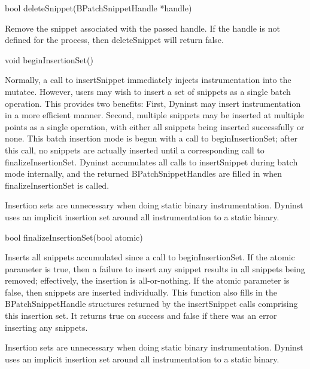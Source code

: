 \begin{apient}
\begin{apient}
bool deleteSnippet(BPatchSnippetHandle *handle)
\end{apient}

\begin{apidesc}
Remove the snippet associated with the passed handle. If the handle is not defined for the process, then deleteSnippet
will return false.
\end{apidesc}

\begin{apient}
void beginInsertionSet()
\end{apient}

\begin{apidesc}
Normally, a call to insertSnippet immediately injects instrumentation into the mutatee. However, users may wish to
insert a set of snippets as a single batch operation. This provides two benefits: First, Dyninst may insert
instrumentation in a more efficient manner. Second, multiple snippets may be inserted at multiple points as a single
operation, with either all snippets being inserted successfully or none. This batch insertion mode is begun with a call
to beginInsertionSet; after this call, no snippets are actually inserted until a corresponding call to
finalizeInsertionSet. Dyninst accumulates all calls to insertSnippet during batch mode internally, and the returned
BPatchSnippetHandles are filled in when finalizeInsertionSet is called.

Insertion sets are un­necessary when doing static binary instrumentation. Dyninst uses an implicit insertion set
around all instrumentation to a static binary.
\end{apidesc}

\begin{apient}
bool finalizeInsertionSet(bool atomic)
\end{apient}

\begin{apidesc}
Inserts all snippets accumulated since a call to beginInsertionSet. If the atomic parameter is true, then a failure to
insert any snippet results in all snippets being removed; effectively, the insertion is all-or-nothing. If the atomic
parameter is false, then snippets are inserted individually. This function also fills in the BPatchSnippetHandle
structures returned by the insertSnippet calls comprising this insertion set. It returns true on success and false if
there was an error inserting any snippets.

Insertion sets are unnecessary when doing static binary instrumentation. Dyninst uses an implicit insertion set around
all instrumentation to a static binary.
\end{apidesc}


\end{apient}
